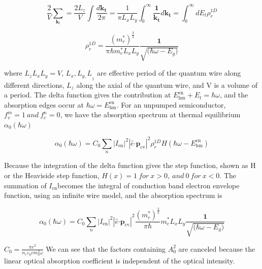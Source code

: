 \begin{equation}
\frac{2}{V}\sum_{\bm{k}_{t}}^{}{= \frac{2L_{z}}{V}}\int_{}^{}\frac{d\bm{k}_{\bm{t}}}{2\pi} = \frac{1}{\pi L_{x}L_{y}}\int_{0}^{\infty}\frac{\bm{1}}{\bm{k}_{\bm{t}}}d\bm{k}_{\bm{t}}\bm{=}\int_{0}^{\infty}{dE_{t}}\rho_{r}^{1D}
\end{equation}

\begin{equation}
\rho_{r}^{1D} = \frac{\left( m_{r}^{*} \right)^{\frac{3}{2}}}{\text{πℏ}m_{e}^{*}L_{x}L_{y}}\frac{\bm{1}}{\sqrt{\bm{(}\hbar\omega - E_{g}\bm{)}}}
\end{equation}

where \(L_{z}L_{x}L_{y} = V\), \({L_{x},L_{y,}L}_{z}\) are effective
period of the quantum wire along different directions, \(L_{z}\) along
the axial of the quantum wire, and V is a volume of a period. The delta
function gives the contribution at
\(E_{\text{hm}}^{\text{en}} + E_{t} = \hbar\omega\), and the
absorption edges occur at \(\hbar\omega = E_{\text{hm}}^{\text{en}}\).
For an unpumped semiconductor, \(f_{v}^{m} = 1\ and\ f_{c}^{n} = 0\), we
have the absorption spectrum at thermal equilibrium
\(\alpha_{0}\left( \hbar\omega \right)\)

\begin{equation}
\alpha_{0}\left( \hbar\omega \right) = C_{0}\sum_{n}^{}\left| I_{\text{en}} \right|^{2}\left| \hat{e}\bm{\cdot}\bm{p}_{\text{cv}} \right|^{2}\rho_{r}^{1D}H(\hbar\omega - E_{\text{hm}}^{\text{en}})
\end{equation}

Because the integration of the delta function gives the step function,
shown as H or the Heaviside step function,
\(H\left( x \right) = 1\ for\ x > 0,\ and\ 0\ for\ x < 0\). The
summation of \(I_{\text{en}}\)becomes the integral of conduction band
electron envelope function, using an infinite wire model, and the
absorption spectrum is

\begin{equation}
\alpha_{0}\left( \hbar\omega \right) = C_{0}{\sum_{n}^{}\left| I_{\text{en}} \right|^{2}\left| \hat{e}\bm{\cdot}\bm{p}_{\text{cv}} \right|}^{2}\frac{\left( m_{r}^{*} \right)^{\frac{3}{2}}}{\pi\hbar}m_{e}^{*}L_{x}L_{y}\frac{\bm{1}}{\sqrt{\bm{(}\hbar\omega - E_{g}\bm{)}}}
\end{equation}

\(C_{0} = \frac{\pi e^{2}}{n_{r}\varepsilon_{0}cm_{0}^{2}\omega}\)
We can see that the factors containing \(A_{0}^{2}\) are canceled
because the linear optical absorption coefficient is independent of the
optical intensity.


